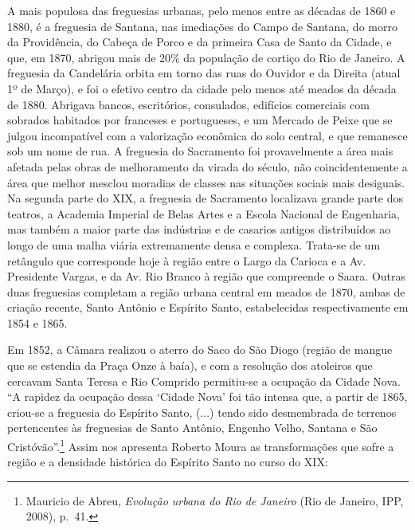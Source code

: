A mais populosa das freguesias urbanas, pelo menos entre as décadas de
1860 e 1880, é a freguesia de Santana, nas imediações do Campo de
Santana, do morro da Providência, do Cabeça de Porco e da primeira Casa
de Santo da Cidade, e que, em 1870, abrigou mais de 20\% da população de
cortiço do Rio de Janeiro. A freguesia da Candelária orbita em torno das
ruas do Ouvidor e da Direita (atual 1º de Março), e foi o efetivo centro
da cidade pelo menos até meados da década de 1880. Abrigava bancos,
escritórios, consulados, edifícios comerciais com sobrados habitados por
franceses e portugueses, e um Mercado de Peixe que se julgou
incompatível com a valorização econômica do solo central, e que
remanesce sob um nome de rua. A freguesia do Sacramento foi
provavelmente a área mais afetada pelas obras de melhoramento da virada
do século, não coincidentemente a área que melhor mesclou moradias de
classes nas situações sociais mais desiguais. Na segunda parte do XIX, a
freguesia de Sacramento localizava grande parte dos teatros, a Academia
Imperial de Belas Artes e a Escola Nacional de Engenharia, mas também a
maior parte das indústrias e de casarios antigos distribuídos ao longo
de uma malha viária extremamente densa e complexa. Trata-se de um
retângulo que corresponde hoje à região entre o Largo da Carioca e a Av.
Presidente Vargas, e da Av. Rio Branco à região que compreende o Saara.
Outras duas freguesias completam a região urbana central em meados de
1870, ambas de criação recente, Santo Antônio e Espírito Santo,
estabelecidas respectivamente em 1854 e 1865.

Em 1852, a Câmara realizou o aterro do Saco do São Diogo (região de
mangue que se estendia da Praça Onze à baía), e com a resolução dos
atoleiros que cercavam Santa Teresa e Rio Comprido permitiu-se a
ocupação da Cidade Nova. ``A rapidez da ocupação dessa `Cidade Nova' foi
tão intensa que, a partir de 1865, criou-se a freguesia do Espírito
Santo, (...) tendo sido desmembrada de terrenos pertencentes às
freguesias de Santo Antônio, Engenho Velho, Santana e São
Cristóvão''.\footnote{Mauricio de Abreu, \emph{Evolução urbana do Rio de
  Janeiro} (Rio de Janeiro, IPP, 2008), p.~41.} Assim nos apresenta
Roberto Moura as transformações que sofre a região e a densidade
histórica do Espírito Santo no curso do XIX:

